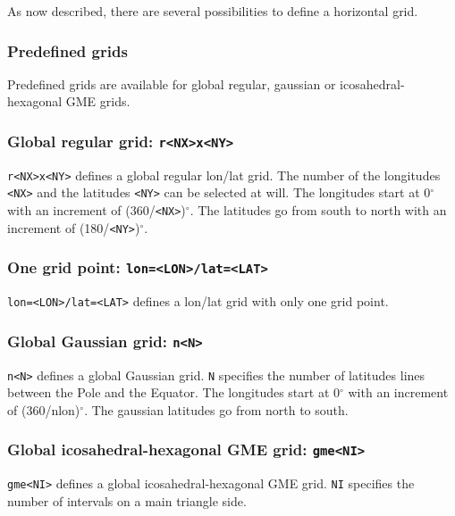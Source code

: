 As now described, there are several possibilities to define a horizontal grid.

\subsubsection{Predefined grids}

Predefined grids are available for global regular, gaussian or icosahedral-hexagonal GME grids.

\subsubsection*{Global regular grid: {\tt r<NX>x<NY>}}
    {\tt r<NX>x<NY>} defines a global regular lon/lat grid.
    The number of the longitudes {\tt <NX>} and the latitudes {\tt <NY>}
    can be selected at will.
    The longitudes start at 0$^\circ$ with an increment of (360/{\tt <NX>})$^\circ$.
    The latitudes go from south to north with an increment of (180/{\tt <NY>})$^\circ$.

\subsubsection*{One grid point: {\tt lon=<LON>/lat=<LAT>}}
    {\tt lon=<LON>/lat=<LAT>} defines a lon/lat grid with only one grid point.

\subsubsection*{Global Gaussian grid: {\tt n<N>}}
    {\tt n<N>} defines a global Gaussian grid. {\tt N} specifies the number of
    latitudes lines between the Pole and the Equator.
    The longitudes start at 0$^\circ$ with an increment of (360/nlon)$^\circ$.
    The gaussian latitudes go from north to south.


\subsubsection*{Global icosahedral-hexagonal GME grid: {\tt gme<NI>}}
    {\tt gme<NI>} defines a global icosahedral-hexagonal GME grid.
    {\tt NI} specifies the number of intervals on a main triangle side.

